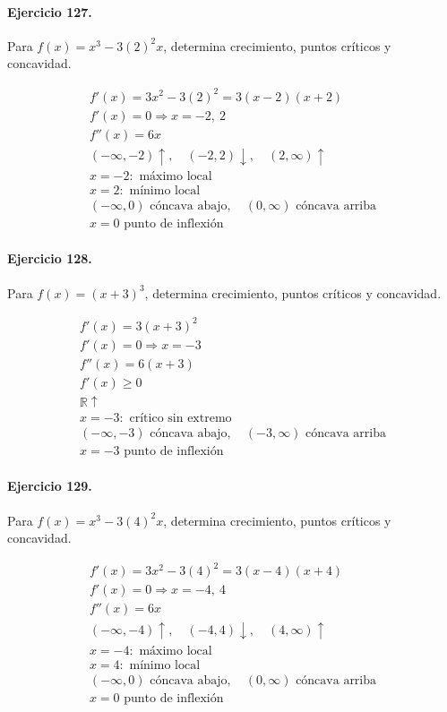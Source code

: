 \documentclass[11pt,a4paper]{article}
\begin{document}
\paragraph{Ejercicio 127.} Para $f(x)=x^3-3(2)^2x$, determina crecimiento, puntos críticos y concavidad.

\[
\begin{aligned}
f'(x)=3x^2-3(2)^2=3(x-2)(x+2)\\
f'(x)=0\Rightarrow x=-2,\ 2\\
f''(x)=6x\\
(-\infty,-2)\uparrow,\quad(-2,2)\downarrow,\quad(2,\infty)\uparrow\\
x=-2:\text{ máximo local}\\
x=2:\text{ mínimo local}\\
(-\infty,0)\text{{ cóncava abajo}},\quad(0,\infty)\text{{ cóncava arriba}}\\
x=0\text{{ punto de inflexión}}
\end{aligned}
\]


\paragraph{Ejercicio 128.} Para $f(x)=(x+3)^3$, determina crecimiento, puntos críticos y concavidad.

\[
\begin{aligned}
f'(x)=3(x+3)^2\\
f'(x)=0\Rightarrow x=-3\\
f''(x)=6(x+3)\\
f'(x)\ge0\\
\mathbb{R}\uparrow\\
x=-3:\text{ crítico sin extremo}\\
(-\infty,-3)\text{ cóncava abajo},\quad(-3,\infty)\text{ cóncava arriba}\\
x=-3\text{ punto de inflexión}
\end{aligned}
\]


\paragraph{Ejercicio 129.} Para $f(x)=x^3-3(4)^2x$, determina crecimiento, puntos críticos y concavidad.

\[
\begin{aligned}
f'(x)=3x^2-3(4)^2=3(x-4)(x+4)\\
f'(x)=0\Rightarrow x=-4,\ 4\\
f''(x)=6x\\
(-\infty,-4)\uparrow,\quad(-4,4)\downarrow,\quad(4,\infty)\uparrow\\
x=-4:\text{ máximo local}\\
x=4:\text{ mínimo local}\\
(-\infty,0)\text{{ cóncava abajo}},\quad(0,\infty)\text{{ cóncava arriba}}\\
x=0\text{{ punto de inflexión}}
\end{aligned}
\]
\end{document}
